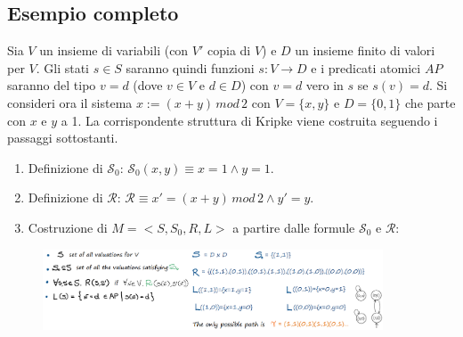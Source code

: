 \documentclass[a4paper,oneside,titlepage]{book}
\begin{document}
\subsection{Esempio completo}
Sia $V$ un insieme di variabili (con $V'$ copia di $V$) e $D$ un insieme finito di valori per $V$. Gli stati $s \in S$ saranno quindi funzioni $s: V \rightarrow D$ e i predicati atomici $AP$ saranno del tipo $v = d$ (dove $v \in V$ e $d \in D$) con $v = d$ vero in $s$ se $s(v) = d$. Si consideri ora il sistema $x := (x+y) \, mod \, 2$ con $V = \{ x,y \}$ e $D = \{ 0,1 \}$ che parte con $x$ e $y$ a 1. La corrispondente struttura di Kripke viene costruita seguendo i passaggi sottostanti.
\begin{enumerate}
    \item Definizione di $\mathcal{S}_0$: $\mathcal{S}_0(x,y) \equiv x=1 \wedge y=1$.
    \item Definizione di $\mathcal{R}$: $\mathcal{R} \equiv x'=(x+y) \, mod \, 2 \wedge y'=y$.
    \item Costruzione di $M=<S,S_0,R,L>$ a partire dalle formule $\mathcal{S}_0$ e $\mathcal{R}$:
\end{enumerate}
\begin{figure}[htp]
	\centering
	\includegraphics[width=0.9\textwidth]{kripke3.png}
\end{figure}
\end{document}
